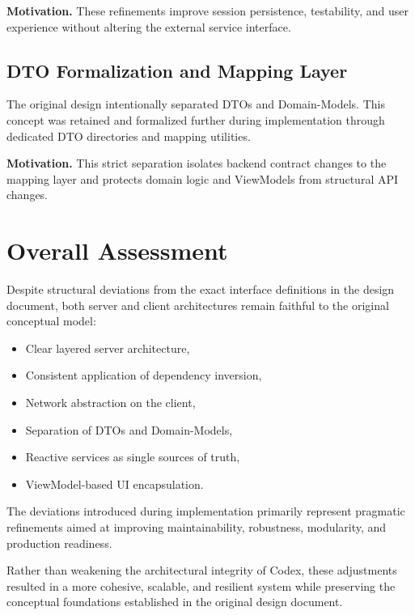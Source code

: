\textbf{Motivation.}  
These refinements improve session persistence, testability, and user experience without altering the external service interface.

\subsection{DTO Formalization and Mapping Layer}

The original design intentionally separated DTOs and Domain-Models. This concept was retained and formalized further during implementation through dedicated DTO directories and mapping utilities.

\textbf{Motivation.}  
This strict separation isolates backend contract changes to the mapping layer and protects domain logic and ViewModels from structural API changes.

\section{Overall Assessment}

Despite structural deviations from the exact interface definitions in the design document, both server and client architectures remain faithful to the original conceptual model:
\begin{itemize}
    \item Clear layered server architecture,
    \item Consistent application of dependency inversion,
    \item Network abstraction on the client,
    \item Separation of DTOs and Domain-Models,
    \item Reactive services as single sources of truth,
    \item ViewModel-based UI encapsulation.
\end{itemize}

The deviations introduced during implementation primarily represent pragmatic refinements aimed at improving maintainability, robustness, modularity, and production readiness.

Rather than weakening the architectural integrity of Codex, these adjustments resulted in a more cohesive, scalable, and resilient system while preserving the conceptual foundations established in the original design document.
